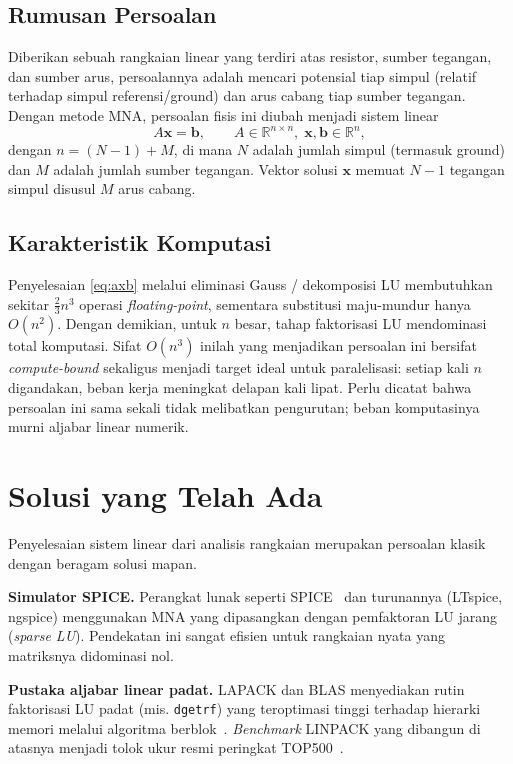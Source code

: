 \documentclass[conference]{IEEEtran}
\begin{document}
\subsection{Rumusan Persoalan}
Diberikan sebuah rangkaian linear yang terdiri atas resistor, sumber tegangan, dan sumber arus, persoalannya adalah mencari potensial tiap simpul (relatif terhadap simpul referensi/ground) dan arus cabang tiap sumber tegangan. Dengan metode MNA, persoalan fisis ini diubah menjadi sistem linear
\begin{equation}
A\mathbf{x}=\mathbf{b}, \qquad A\in\mathbb{R}^{n\times n},\; \mathbf{x},\mathbf{b}\in\mathbb{R}^{n},
\label{eq:axb}
\end{equation}
dengan $n=(N-1)+M$, di mana $N$ adalah jumlah simpul (termasuk ground) dan $M$ adalah jumlah sumber tegangan. Vektor solusi $\mathbf{x}$ memuat $N-1$ tegangan simpul disusul $M$ arus cabang.

\subsection{Karakteristik Komputasi}
Penyelesaian \eqref{eq:axb} melalui eliminasi Gauss / dekomposisi LU membutuhkan sekitar $\tfrac{2}{3}n^3$ operasi \emph{floating-point}, sementara substitusi maju-mundur hanya $O(n^2)$. Dengan demikian, untuk $n$ besar, tahap faktorisasi LU mendominasi total komputasi. Sifat $O(n^3)$ inilah yang menjadikan persoalan ini bersifat \emph{compute-bound} sekaligus menjadi target ideal untuk paralelisasi: setiap kali $n$ digandakan, beban kerja meningkat delapan kali lipat. Perlu dicatat bahwa persoalan ini sama sekali tidak melibatkan pengurutan; beban komputasinya murni aljabar linear numerik.

\section{Solusi yang Telah Ada}
Penyelesaian sistem linear dari analisis rangkaian merupakan persoalan klasik dengan beragam solusi mapan.

\textbf{Simulator SPICE.} Perangkat lunak seperti SPICE~\cite{nagel1975spice} dan turunannya (LTspice, ngspice) menggunakan MNA yang dipasangkan dengan pemfaktoran LU jarang (\emph{sparse LU}). Pendekatan ini sangat efisien untuk rangkaian nyata yang matriksnya didominasi nol.

\textbf{Pustaka aljabar linear padat.} LAPACK dan BLAS menyediakan rutin faktorisasi LU padat (mis. \texttt{dgetrf}) yang teroptimasi tinggi terhadap hierarki memori melalui algoritma berblok~\cite{golub2013matrix}. \emph{Benchmark} LINPACK yang dibangun di atasnya menjadi tolok ukur resmi peringkat TOP500~\cite{dongarra2003linpack}.
\end{document}
